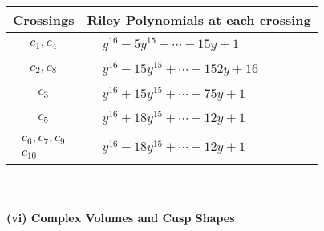 \documentclass[1p]{elsarticle_modified}
\theoremstyle{definition}
\begin{document}
\begin{tabular}{m{50pt}|m{274pt}}
Crossings & \hspace{64pt}Riley Polynomials at each crossing \\
\hline $$\begin{aligned}c_{1},c_{4}\end{aligned}$$&$\begin{aligned}
&y^{16}-5 y^{15}+\cdots-15 y+1
\end{aligned}$\\
\hline $$\begin{aligned}c_{2},c_{8}\end{aligned}$$&$\begin{aligned}
&y^{16}-15 y^{15}+\cdots-152 y+16
\end{aligned}$\\
\hline $$\begin{aligned}c_{3}\end{aligned}$$&$\begin{aligned}
&y^{16}+15 y^{15}+\cdots-75 y+1
\end{aligned}$\\
\hline $$\begin{aligned}c_{5}\end{aligned}$$&$\begin{aligned}
&y^{16}+18 y^{15}+\cdots-12 y+1
\end{aligned}$\\
\hline $$\begin{aligned}c_{6},c_{7},c_{9}\\c_{10}\end{aligned}$$&$\begin{aligned}
&y^{16}-18 y^{15}+\cdots-12 y+1
\end{aligned}$\\
\hline
\end{tabular}\\~\\
\newpage\flushleft \textbf{(vi) Complex Volumes and Cusp Shapes}
\end{document}
